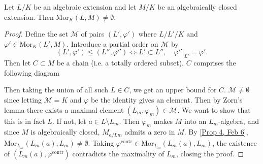 \begin{cor} \label{Cor 6, Feb 6}
Let $L/K$ be an algebraic extension and let $M/K$ be an algebraically closed extension. Then Mor$_K(L,M) \neq \emptyset$.
\end{cor}

\begin{proof}
Define the set $\mathcal{M}$ of pairs $(L', \varphi')$ where $L/L'/K$ and $\varphi' \in \text{Mor}_K(L', M)$. Introduce a partial order on $\mathcal{M}$ by
\[(L', \varphi') \leq (L'', \varphi'') \Leftrightarrow L' \subset L'', \quad \left. \varphi''\right|_{L'} = \varphi'.\]
Then let $C \subset M$ be a chain (i.e. a totally ordered subset). $C$ comprises the following diagram
\begin{center}
\end{center}
Then taking the union of all such $L \in C$, we get an upper bound for $C$. $\mathcal{M} \neq \emptyset$ since letting $\mathcal{M} = K$ and $\varphi$ be the identity gives an element. Then by Zorn's lemma there exists a maximal element $(L_m, \varphi_m) \in \mathcal{M}$. We want to show that this is in fact $L$. If not, let $a \in L \setminus L_m$. Then $\varphi_m$ makes $M$ into an $L_m$-algebra, and since $M$ is algebraically closed, $M_{a/Lm}$ admits a zero in $M$. By \ref{Prop 4, Feb 6}, Mor$_{L_m}(L_m(a), L_m) \neq \emptyset$. Taking $\varphi^{\text{contr}} \in \text{Mor}_{L_m}(L_m(a), L_m)$, the existence of $(L_m(a), \varphi^{\text{contr}})$ contradicts the maximality of $L_m$, closing the proof.
\end{proof}

